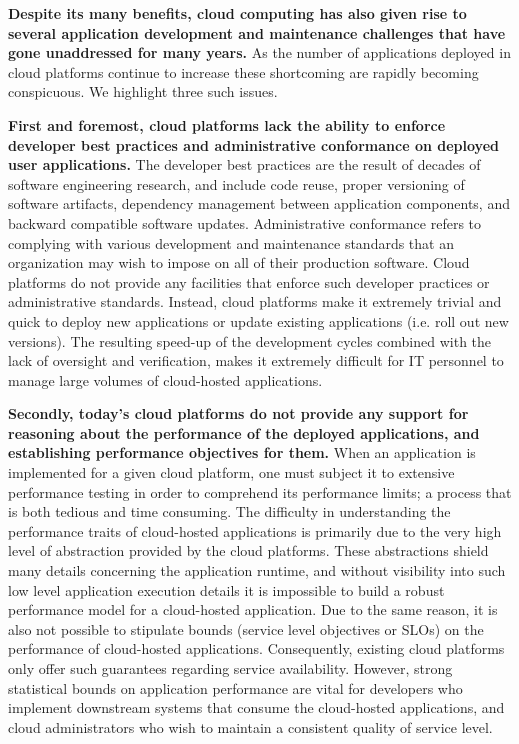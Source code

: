 \textbf{Despite its many benefits, cloud computing has also given rise to several application
development and maintenance challenges that have gone unaddressed for many years.}
As the number of applications deployed in cloud platforms continue to increase these
shortcoming are rapidly becoming conspicuous. We highlight three such issues.
 
\textbf{First and foremost, cloud platforms lack the ability to enforce developer best practices
and administrative conformance on deployed user applications.} The developer best practices 
are the result of decades of software engineering research, and
include code reuse, proper versioning of software artifacts, dependency management
between application components, and backward compatible software updates. Administrative
conformance refers to complying with various development and maintenance standards
that an organization may wish to impose on all of their production software.
Cloud platforms do not provide any facilities that enforce such developer practices or
administrative standards. Instead, cloud platforms
make it extremely trivial and quick to deploy new applications or update existing
applications (i.e. roll out new versions). The resulting speed-up of the development cycles combined with the lack of 
oversight and verification, makes it extremely difficult for 
IT personnel to manage large volumes of cloud-hosted applications.

\textbf{Secondly, today's cloud platforms do not provide any support for reasoning about the 
performance of the deployed applications, and establishing performance objectives for them.} 
When an application is implemented for
a given cloud platform, one must subject it to extensive performance testing in order
to comprehend its performance limits; a process that is both 
tedious and time consuming. The difficulty in understanding the performance 
traits of cloud-hosted applications is primarily due to the very high level of 
abstraction provided by the cloud platforms. These abstractions shield many details 
concerning the application runtime, and without visibility into such low level application 
execution details it is impossible
to build a robust performance model for a cloud-hosted application. Due to the same
reason, it is also not possible to stipulate bounds (service level objectives or SLOs) on
the performance of cloud-hosted applications. 
Consequently, existing cloud platforms only offer such guarantees regarding service availability.
However, strong statistical bounds on application performance are vital for developers 
who implement downstream systems that consume the cloud-hosted applications,
and cloud administrators who wish to maintain a consistent quality of service
level.

